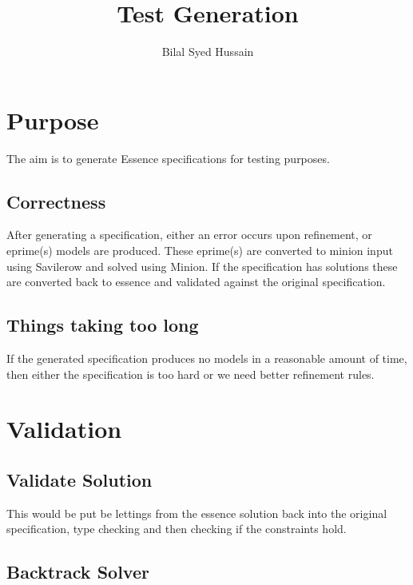 

\title{Test Generation}
\author{Bilal Syed Hussain}
\pagestyle{plain}


\maketitle

\section{Purpose}

The aim is to generate Essence specifications for testing purposes.

\subsection{Correctness}

After generating a specification, either an error occurs upon refinement, or eprime(s) models are produced.  These eprime(s) are converted to minion input using Savilerow and solved using Minion. If the specification has solutions these are converted back to essence and validated against the original specification. 

\subsection{Things taking too long}

If the generated specification produces no models  in a reasonable amount of time, then either the specification is too hard or we need better refinement rules.

\section{Validation}

\subsection{Validate Solution}

This would be put be lettings from the essence solution back into the original specification, type checking and then checking if the constraints hold.

\subsection{Backtrack Solver}

